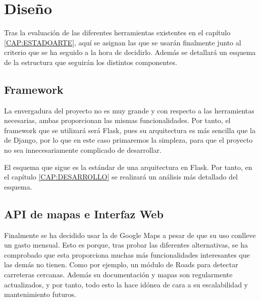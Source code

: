   

\section{Diseño\label{SEC:DISENO}}
  Tras la evaluación de las diferentes herramientas existentes en el capítulo \ref{CAP:ESTADOARTE}, aquí se asignan las que se usarán finalmente junto al criterio que se ha seguido a la hora de decidirlo. Además se detallará un esquema de la estructura que seguirán los distintos componentes.
  
  
  \subsection{Framework}
    La envergadura del proyecto no es muy grande y con respecto a las herramientas necesarias, ambas proporcionan las mismas funcionalidades. Por tanto, el framework que se utilizará será Flask, pues su arquitectura es más sencilla que la de Django, por lo que en este caso primaremos la simpleza, para que el proyecto no sea innecesariamente complicado de desarrollar.
    
    El esquema que sigue es la estándar de una arquitectura  en Flask. Por tanto, en el capítulo \ref{CAP:DESARROLLO} se realizará un análisis más detallado del esquema.

  \subsection{API de mapas e Interfaz Web}
    Finalmente se ha decidido usar la  de Google Maps\cite{gmaps} a pesar de que su uso conlleve un gasto mensual. Esto es porque, tras probar las diferentes alternativas, se ha comprobado que esta  proporciona muchas más funcionalidades interesantes que las demás no tienen. Como por ejemplo, un módulo de Roads para detectar carreteras cercanas.
    Además su documentación y mapas son regularmente actualizados, y por tanto, todo esto la hace idónea de cara a su escalabilidad y mantenimiento futuros.

